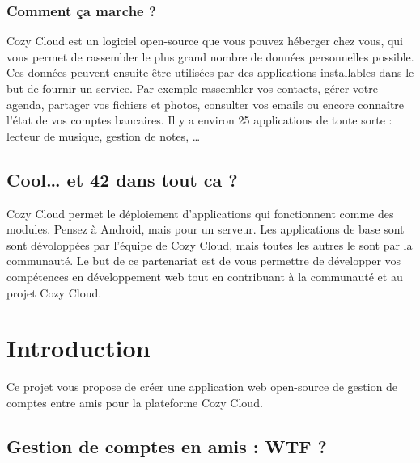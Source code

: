 \documentclass{42-fr}
\begin{document}
		\subsection{Comment ça marche ?}

			Cozy Cloud est un logiciel open-source que vous pouvez h\'eberger chez vous, 
			qui vous permet de rassembler le plus grand nombre de donn\'ees
			personnelles possible. Ces donn\'ees peuvent ensuite \^etre utilis\'ees par des 
			applications installables dans le but de fournir un service. Par exemple
			rassembler vos contacts, g\'erer votre agenda, partager vos fichiers et 
			photos, consulter vos emails ou encore conna\^itre l'état de vos comptes
			bancaires. Il y a environ 25 applications de toute sorte : lecteur de musique,
			gestion de notes, …

	\section{Cool… et 42 dans tout ca ?}

		Cozy Cloud permet le déploiement d'applications qui fonctionnent comme
		des modules. Pensez à Android, mais pour un serveur. Les applications de 
		base sont sont d\'evolopp\'ees par l'équipe de Cozy Cloud, mais toutes 
		les autres le sont par la communaut\'e. Le but de ce partenariat est de vous
		permettre de d\'evelopper vos comp\'etences en d\'eveloppement web tout
		en contribuant \`a la communaut\'e et au projet Cozy Cloud.


\chapter{Introduction}

	Ce projet vous propose de cr\'eer une application web open-source de gestion de
	comptes entre amis pour la plateforme Cozy Cloud.

	\section{Gestion de comptes en amis : WTF ?}
\end{document}
